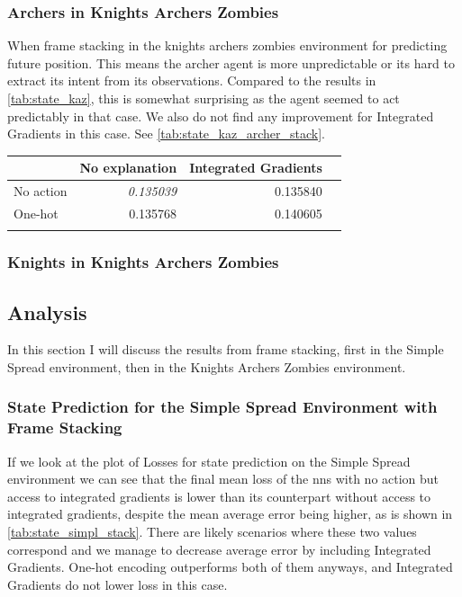 \documentclass[UKenglish]{uiomasterthesis}
\begin{document}
\subsubsection{Archers in Knights Archers Zombies}
\label{sec:kaz_exp3}

When frame stacking in the knights archers zombies environment for predicting future position. This means the archer agent is more unpredictable or its hard to extract its intent from its observations. Compared to the results in \cref{tab:state_kaz}, this is somewhat surprising as the agent seemed to act predictably in that case. We also do not find any improvement for Integrated Gradients in this case. See \cref{tab:state_kaz_archer_stack}.

\begin{center}
\label{tab:state_kaz_archer_stack}
\begin{tabular}{lrrr}
\toprule
 & No explanation & Integrated Gradients \\
\midrule
    No action & \textit{0.135039} & 0.135840 \\
One-hot & 0.135768 & 0.140605 \\
\bottomrule
\addlinespace[2pt]
\multicolumn{3}{l}{\textsuperscript{***}$p<0.001$, 
  \textsuperscript{**}$p<0.01$, 
  \textsuperscript{*}$p<0.05$}
\end{tabular}
\end{center}

\subsubsection{Knights in Knights Archers Zombies}




\subsection{Analysis}
In this section I will discuss the results from frame stacking, first in the Simple Spread environment, then in the Knights Archers Zombies environment.


\subsubsection{State Prediction for the Simple Spread Environment with Frame Stacking}

If we look at the plot of Losses for state prediction on the Simple Spread environment we can see that the final mean loss of the \acp{nn} with no action but access to integrated gradients is lower than its counterpart without access to integrated gradients, despite the mean average error being higher, as is shown in \cref{tab:state_simpl_stack}. There are likely scenarios where these two values correspond and we manage to decrease average error by including Integrated Gradients. One-hot encoding outperforms both of them anyways, and Integrated Gradients do not lower loss in this case.
\end{document}
